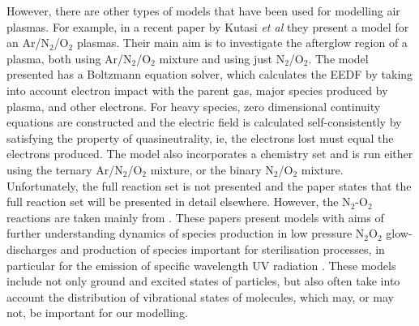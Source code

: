 \documentclass[11pt, oneside]{article}   	%
\begin{document}
However, there are other types of models that have been used for modelling air plasmas.
For example, in a recent paper by Kutasi \textit{et al} \cite{Kutasi2016tuning} they present a model for an Ar/N$_2$/O$_2$ plasmas.
Their main aim is to investigate the afterglow region of a plasma, both using Ar/N$_2$/O$_2$ mixture and using just N$_2$/O$_2$.
The model presented has a Boltzmann equation solver, which calculates the EEDF by taking into account electron impact with the parent gas, major species produced by plasma, and other electrons.
For heavy species, zero dimensional continuity equations are constructed and the electric field is calculated self-consistently by satisfying the property of quasineutrality, ie, the electrons lost must equal the electrons produced.
The model also incorporates a chemistry set and is run either using the ternary Ar/N$_2$/O$_2$ mixture, or the binary N$_2$/O$_2$ mixture.
Unfortunately, the full reaction set is not presented and the paper states that the full reaction set will be presented in detail elsewhere.
However, the N$_2$-O$_2$ reactions are taken mainly from \cite{Guerra1997self, Pintassilgo2005modelling, Kutasi2008modelling}.
These papers present models with aims of further understanding dynamics of species production in low pressure N$_2$O$_2$ glow-discharges \cite{Guerra1997self} and production of species important for sterilisation processes, in particular for the emission of specific wavelength UV radiation \cite{Pintassilgo2005modelling, Kutasi2008modelling}.
These models include not only ground and excited states of particles, but also often take into account the distribution of vibrational states of molecules, which may, or may not, be important for our modelling.


%
\end{document}
